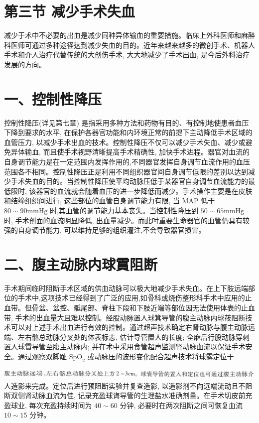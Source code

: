 \documentclass[10pt]{article}
\begin{document}
\section*{第三节 减少手术失血}
减少于术中不必要的出血是减少同种异体输血的重要措施。临床上外科医师和麻醉科医师可通过多种途径达到减少失血的目的。近年来越来越多的微创手术、机器人手术和介人治疗代替传统的大创伤手术, 大大地减少了手术出血, 是今后外科治疗发展的方向。

\section*{一、控制性降压}
控制性降压(详见第七章) 是指采用多种方法和药物有目的、有控制地使患者血压下降到要求的水平, 在保护各器官功能和内环境正常的前提下主动降低手术区域的血管压力, 以减少手术出血的技术。控制性降压不仅可以减少手术失血、减少或避免异体输血, 而且使手术视野清晰提高手术精确性, 加快手术进程。器官对血流的自身调节能力是在一定范围内发挥作用的,不同器官发挥自身调节血流作用的血压范围各不相同。控制性降压正是利用不同组织器官间自身调节低限的差别以达到减少手术失血的目的。当控制性降压使平均动脉压低于某器官自身调节血流能力的最低限时, 该器官的血流就会随着血压的进一步降低而减少。手术操作主要是在皮肤和结缔组织间进行, 这些部位的血管自身调节能力有限, 当 MAP 低于 $80 \sim 90 \mathrm{mmHg}$ 时,其血管的调节能力基本丧失。当控制性降压到 $50 \sim 65 \mathrm{mmHg}$ 时, 手术创面的血流明显降低, 出血量减少。而此吋重要生命器官的血管仍具有较强的自身调节能力, 可以维持足够的组织灌注,不会导致器官损害。

\section*{二、腹主动脉内球霣阻断}
手术期间临时阻断手术区域的供血动脉可以极大地减少手术失血。在上下肢远端部位的手术中,这项技术已经得到了广泛的应用,如骨科或烧伤整形科手术中应用的止血带。但骨盆、盆控、骶尾部、脊柱下段和下肢近端等部位因无法使用体表的止血带, 手术的出血量大且难以控制。经股动脉置人球箕导管的腹主动脉内球莜阻断技术可以对上述手术出血进行有效的控制。通过超声技术确定右肾动脉与腹主动脉远端、左右骼总动脉分叉处的体表标志, 估计导管置人的长度; 全麻后行股动脉穿刺置人球霣导管至腹主动脉内; 并在术中采用食管超声监测肾动脉血流以保证手术安全。通过观察双脚趾 $\mathrm{SpO}_{2}$ 或动脉压的波形变化配合超声技术将球露定位于

\includegraphics[max width=\textwidth, center]{2024_07_09_002a177993bd97d1d6d7g-190}\\
人造影来完成。定位后进行预阻断实验并复查造影, 以造影剂不向远端流动且不阻断双侧肾动脉血流为佳, 记录充盈球诲导管的生理盐水准确剂量。在手术切皮前充盈球业, 每次充盈持续时间为 $40 \sim 60$ 分钟, 必要时在两次阻断之间可恢复血流 $10 \sim 15$ 分钟。
\end{document}
